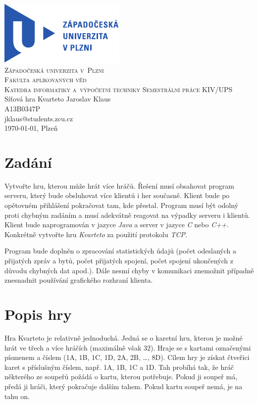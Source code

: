 \documentclass[12pt, a4paper]{article}
\begin{document}
	\begin{titlepage}
		\begin{center}
			\includegraphics{img/ZCULogo.pdf}\\[1cm]
			\textsc{\LARGE Západočeská univerzita v~Plzni}\\[0.1cm]
			\textsc{\Large Fakulta aplikovaných věd}\\[0.1cm]
			\textsc{\large Katedra informatiky a~výpočetní techniky}
			\vfill
			\textsc{\LARGE Semestrální práce KIV/UPS}\\[0.2cm]
			\Large{Síťová hra Kvarteto}
			\vfill
			Jaroslav Klaus\\
			A13B0347P\\
			jklaus@students.zcu.cz\\[0.2cm]
			\today, Plzeň
		\end{center}
	\end{titlepage}

	\tableofcontents
	\newpage

	\section{Zadání}
	Vytvořte hru, kterou může hrát více hráčů. Řešení musí obsahovat program serveru, který bude obsluhovat více klientů i her současně. Klient bude po opětovném přihlášení pokračovat tam, kde přestal. Program musí být odolný proti chybným zadáním a musí adekvátně reagovat na výpadky serveru i klientů. Klient bude naprogramován v jazyce \emph{Java} a server v jazyce \emph{C} nebo \emph{C++}. Konkrétně vytvořte hru \emph{Kvarteto} za použití protokolu \emph{TCP}.
	
	Program bude doplněn o zpracování statistických údajů (počet odeslaných a přijatých zpráv a bytů, počet přijatých spojení, počet spojení ukončených z důvodu chybných dat apod.). Dále nesmí chyby v komunikaci znemožnit případně znesnadnit používání grafického rozhraní klienta.
	
	\section{Popis hry}
	Hra Kvarteto je relativně jednoduchá. Jedná se o karetní hru, kterou je možné hrát ve třech a více hráčích (maximálně však 32). Hraje se s kartami označenými písmenem a číslem (1A, 1B, 1C, 1D, 2A, 2B, \dots, 8D). Cílem hry je získat čtveřici karet s příslušným číslem, např. 1A, 1B, 1C a 1D. Tah probíhá tak, že hráč některého ze soupeřů požádá o kartu, kterou potřebuje. Pokud ji soupeř má, předá ji hráči, který pokračuje dalším tahem. Pokud kartu soupeř nemá, je na tahu on.
	
\end{document}
